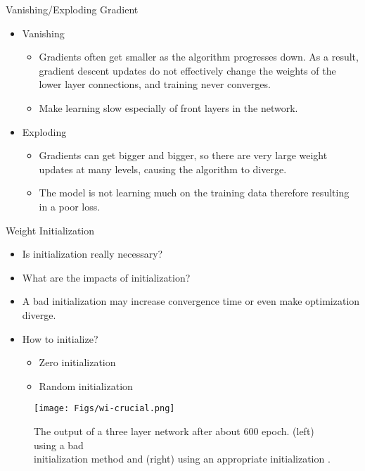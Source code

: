 \documentclass[compress,oilve,t]{beamer}
\begin{document}
\begin{frame}{Vanishing/Exploding Gradient}
	\begin{itemize}
		\item Vanishing
		\begin{itemize}
			\item Gradients often get smaller as the algorithm progresses down. As a result, gradient descent updates do not effectively change the weights of the lower layer connections, and training never converges.
			\medskip
			\item Make learning slow especially of front layers in the network.
			\medskip
		\end{itemize}
		\item Exploding
		\begin{itemize}
			\item Gradients can get bigger and bigger, so there are very large weight updates at many levels, causing the algorithm to diverge.
			\medskip
			\item The model is not learning much on the training data therefore resulting in a poor loss.
			\medskip
		\end{itemize}
	\end{itemize}
\end{frame}


\begin{frame}{Weight Initialization}
	\begin{itemize}
		\item Is initialization really necessary?
		\item What are the impacts of initialization?
		\item A bad initialization may increase convergence time or even make optimization diverge.
		\item How to initialize?
		\begin{itemize}
			\item Zero initialization
			\item Random initialization
		\end{itemize}
	\end{itemize}
	\begin{figure}[H]
		\centering
		\texttt{[image: Figs/wi-crucial.png]}
		\caption{The output of a three layer network after about 600 epoch. (left) using a bad\\ initialization method and (right) using an appropriate initialization \cite{katanforoosh-kunin}.}
	\end{figure}
\end{frame}
\end{document}
